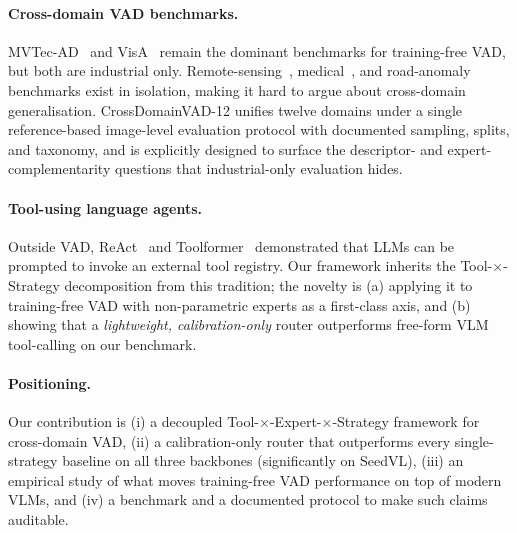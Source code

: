 \paragraph{Cross-domain VAD benchmarks.}
MVTec-AD~\citep{bergmann2019mvtec} and VisA~\citep{zou2022visa} remain the dominant benchmarks for training-free VAD, but both are industrial only. Remote-sensing~\citep{chen2020levircd}, medical~\citep{bao2024bmad,yang2023medmnist}, and road-anomaly~\citep{lis2019detecting,yu2020bdd100k} benchmarks exist in isolation, making it hard to argue about cross-domain generalisation. CrossDomainVAD-12 unifies twelve domains under a single reference-based image-level evaluation protocol with documented sampling, splits, and taxonomy, and is explicitly designed to surface the descriptor- and expert-complementarity questions that industrial-only evaluation hides.

\paragraph{Tool-using language agents.}
Outside VAD, ReAct~\citep{yao2023react} and Toolformer~\citep{schick2023toolformer} demonstrated that LLMs can be prompted to invoke an external tool registry. Our framework inherits the Tool-$\times$-Strategy decomposition from this tradition; the novelty is (a) applying it to training-free VAD with non-parametric experts as a first-class axis, and (b) showing that a \emph{lightweight, calibration-only} router outperforms free-form VLM tool-calling on our benchmark.

\paragraph{Positioning.}
Our contribution is (i) a decoupled Tool-$\times$-Expert-$\times$-Strategy framework for cross-domain VAD, (ii) a calibration-only router that outperforms every single-strategy baseline on all three backbones (significantly on SeedVL), (iii) an empirical study of what moves training-free VAD performance on top of modern VLMs, and (iv) a benchmark and a documented protocol to make such claims auditable.
